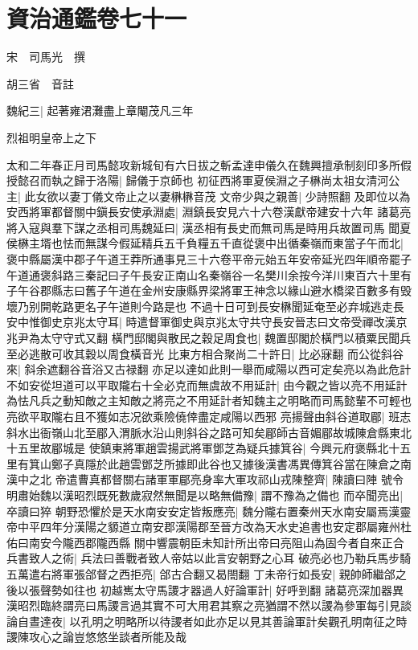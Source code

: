 \section{資治通鑑卷七十一}
宋　司馬光　撰

胡三省　音註

魏紀三|{
	起著雍涒灘盡上章閹茂凡三年}


烈祖明皇帝上之下

太和二年春正月司馬懿攻新城旬有六日拔之斬孟達申儀久在魏興擅承制刻印多所假授懿召而執之歸于洛陽|{
	歸儀于京師也}
初征西將軍夏侯淵之子楙尚太祖女清河公主|{
	此女欲以妻丁儀文帝止之以妻楙楙音茂}
文帝少與之親善|{
	少詩照翻}
及即位以為安西將軍都督關中鎭長安使承淵處|{
	淵鎮長安見六十六卷漢獻帝建安十六年}
諸葛亮將入寇與羣下謀之丞相司馬魏延曰|{
	漢丞相有長史而無司馬是時用兵故置司馬}
聞夏侯楙主壻也怯而無謀今假延精兵五千負糧五千直從褒中出循秦嶺而東當子午而北|{
	褒中縣屬漢中郡子午道王莽所通事見三十六卷平帝元始五年安帝延光四年順帝罷子午道通褒斜路三秦記曰子午長安正南山名秦嶺谷一名樊川余按今洋川東百六十里有子午谷郡縣志曰舊子午道在金州安康縣界梁將軍王神念以緣山避水橋梁百數多有毁壞乃别開乾路更名子午道則今路是也}
不過十日可到長安楙聞延奄至必弃城逃走長安中惟御史京兆太守耳|{
	時遣督軍御史與京兆太守共守長安晉志曰文帝受禪改漢京兆尹為太守守式又翻}
橫門邸閣與散民之穀足周食也|{
	魏置邸閣於橫門以積粟民聞兵至必逃散可收其穀以周食橫音光}
比東方相合聚尚二十許日|{
	比必寐翻}
而公從斜谷來|{
	斜余遮翻谷音浴又古禄翻}
亦足以達如此則一舉而咸陽以西可定矣亮以為此危計不如安從坦道可以平取隴右十全必克而無虞故不用延計|{
	由今觀之皆以亮不用延計為怯凡兵之動知敵之主知敵之將亮之不用延計者知魏主之明略而司馬懿輩不可輕也亮欲平取隴右且不獲如志况欲乘險僥倖盡定咸陽以西邪}
亮揚聲由斜谷道取郿|{
	班志斜水出衙嶺山北至郿入渭脈水沿山則斜谷之路可知矣郿師古音媚郿故城陳倉縣東北十五里故郿城是}
使鎮東將軍趙雲揚武將軍鄧芝為疑兵據箕谷|{
	今興元府褒縣北十五里有箕山鄭子真隱於此趙雲鄧芝所據即此谷也又據後漢書馮異傳箕谷當在陳倉之南漢中之北}
帝遣曹真都督關右諸軍軍郿亮身率大軍攻祁山戎陳整齊|{
	陳讀曰陣}
號令明肅始魏以漢昭烈既死數歲寂然無聞是以略無備豫|{
	謂不豫為之備也}
而卒聞亮出|{
	卒讀曰猝}
朝野恐懼於是天水南安安定皆叛應亮|{
	魏分隴右置秦州天水南安屬焉漢靈帝中平四年分漢陽之䝠道立南安郡漢陽郡至晉方改為天水史追書也安定郡屬雍州杜佑曰南安今隴西郡隴西縣}
關中響震朝臣未知計所出帝曰亮阻山為固今者自來正合兵書致人之術|{
	兵法曰善戰者致人帝姑以此言安朝野之心耳}
破亮必也乃勒兵馬步騎五萬遣右將軍張郃督之西拒亮|{
	郃古合翻又曷閤翻}
丁未帝行如長安|{
	親帥師繼郃之後以張聲勢如往也}
初越嶲太守馬謖才器過人好論軍計|{
	好呼到翻}
諸葛亮深加器異漢昭烈臨終謂亮曰馬謖言過其實不可大用君其察之亮猶謂不然以謖為參軍每引見談論自晝達夜|{
	以孔明之明略所以待謖者如此亦足以見其善論軍計矣觀孔明南征之時謖陳攻心之論豈悠悠坐談者所能及哉}

